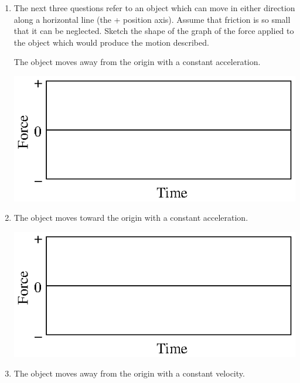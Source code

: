 \begin{enumerate}
\item The next three questions refer to an object which can move in either direction along a
horizontal line (the + position axis). Assume that friction is so small that
it can be neglected. Sketch the shape of the graph of the force applied to the
object which would produce the motion described. 

The object moves away from the origin with a constant acceleration.

\vspace{0.3cm}
{\par\centering \includegraphics{iqsForce/force1_fig10.eps} \par}
\vspace{0.3cm}

\item The object moves toward the origin with a constant acceleration.

\vspace{0.3cm}
{\par\centering \includegraphics{iqsForce/force1_fig10.eps} \par}
\vspace{0.3cm}

\newpage

\item The object moves away from the origin with a constant velocity.


\end{enumerate}
